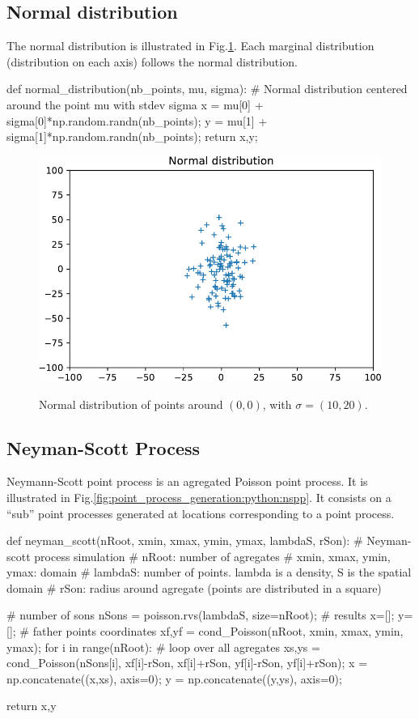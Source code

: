 \subsection{Normal distribution}
The normal distribution is illustrated in Fig.\ref{fig:point_process_generation:python:npp}. Each marginal distribution (distribution on each axis) follows the normal distribution.

\begin{python}
def normal_distribution(nb_points, mu, sigma):
    # Normal distribution centered around the point mu with stdev sigma
    x = mu[0] + sigma[0]*np.random.randn(nb_points);
    y = mu[1] + sigma[1]*np.random.randn(nb_points);
    return x,y;
\end{python}

\begin{figure}[H]
 \centering\caption{Normal distribution of points around $(0,0)$, with $\sigma=(10, 20)$.}%
 \includegraphics[width=.5\textwidth]{npp-crop.pdf}%
 \label{fig:point_process_generation:python:npp}%
\end{figure}

\vspace*{-10pt}


\subsection{Neyman-Scott Process}
Neymann-Scott point process is an agregated Poisson point process. It is illustrated in Fig.\ref{fig:point_process_generation:python:nspp}. It consists on a ``sub'' point processes generated at locations corresponding to a point process.

\begin{python}
def neyman_scott(nRoot, xmin, xmax, ymin, ymax, lambdaS, rSon):
    # Neyman-scott process simulation
    # nRoot: number of agregates
    # xmin, xmax, ymin, ymax: domain
    # lambdaS: number of points. lambda is a density, S is the spatial domain
    # rSon: radius around agregate (points are distributed in a square)
    
    # number of sons
    nSons = poisson.rvs(lambdaS, size=nRoot);
    # results    
    x=[];
    y=[];
    # father points coordinates
    xf,yf = cond_Poisson(nRoot, xmin, xmax, ymin, ymax);
    for i in range(nRoot):
        # loop over all agregates
        xs,ys = cond_Poisson(nSons[i], xf[i]-rSon, xf[i]+rSon, yf[i]-rSon, yf[i]+rSon);
        x = np.concatenate((x,xs), axis=0);
        y = np.concatenate((y,ys), axis=0);
    
    return x,y
\end{python}

